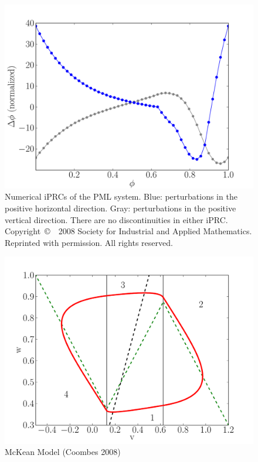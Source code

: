 \documentclass{beamer}
\begin{document}
\begin{frame}
 \begin{figure}[h!]
\begin{center} \includegraphics[width=.75\textwidth]{pml_prc_fig.pdf}\end{center}
\caption[Numerical iPRCs of the PML system]{Numerical iPRCs of the PML system. Blue: perturbations in the positive horizontal direction. Gray: perturbations in the positive vertical direction.  There are no discontinuities in either iPRC. Copyright~\copyright~~2008 Society for Industrial and Applied Mathematics.  Reprinted with permission.  All rights reserved.}
\label{fig:pml_iprc}\end{figure}
\end{frame}

\begin{frame}
 \begin{figure}
\includegraphics[width=\textwidth]{pmk_fig.pdf}
\caption{McKean Model (Coombes 2008)}\end{figure}
\end{frame}
\end{document}
